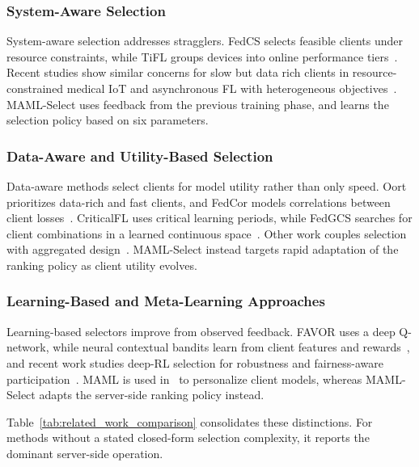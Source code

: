 \documentclass[journal]{IEEEtran}
\theoremstyle{remark}
\newcommand{\revision}[1]{#1}
\begin{document}
\subsubsection{System-Aware Selection}
System-aware selection addresses stragglers. FedCS selects feasible clients under resource constraints, while TiFL groups devices into online performance tiers~\cite{nishio2019client,chai2020tifl}. Recent studies show similar concerns for slow but data rich clients in resource-constrained medical IoT and asynchronous FL with heterogeneous objectives~\cite{tapwal2026stragglers,forootani2026asynchronous}. MAML-Select uses feedback from the previous training phase, and learns the selection policy based on six parameters. %

\subsubsection{Data-Aware and Utility-Based Selection}
Data-aware methods select clients for model utility rather than only speed. Oort prioritizes data-rich and fast clients, and FedCor models correlations between client losses~\cite{lai2021oort,tang2022fedcor}. CriticalFL uses critical learning periods, while FedGCS searches for client combinations in a learned continuous space~\cite{yan2023criticalfl,ning2024fedgcs}. Other work couples selection with aggregated design~\cite{xu2024federated,tran2026fedimp}. MAML-Select instead targets rapid adaptation of the ranking policy as client utility evolves.

\subsubsection{Learning-Based and Meta-Learning Approaches}
Learning-based selectors improve from observed feedback. FAVOR uses a deep Q-network, while neural contextual bandits learn from client features and rewards~\cite{wang2020optimizing,pan2024contextual}, and recent work studies deep-RL selection for robustness and fairness-aware participation~\cite{kazemi2026robust,arisdakessian2026vox}. MAML is used in~\cite{fallah2020personalized} to personalize client models, whereas MAML-Select adapts the server-side ranking policy instead.

\revision{Table~\ref{tab:related_work_comparison} consolidates these distinctions. For methods without a stated closed-form selection complexity, it reports the dominant server-side operation.}
\end{document}
